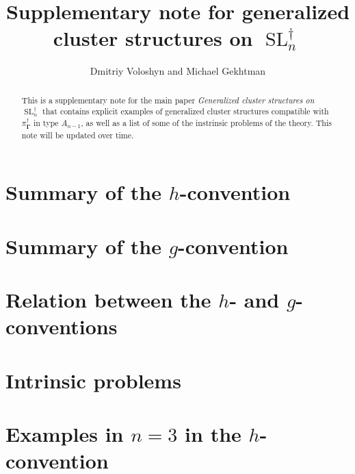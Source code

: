 \documentclass[11pt]{article}%
\DeclareMathOperator{\SL}{SL}
\newcommand{\bg}{\mathbf{\Gamma}}
\theoremstyle{definition}\newtheorem{definition}{Definition}[section]
\theoremstyle{definition}\newtheorem{remark}[definition]{Remark}
\theoremstyle{remark}
\numberwithin{equation}{section}
\begin{document}
\setcounter{tocdepth}{2}



\title{Supplementary note for generalized cluster structures on $\SL_n^{\dagger}$}
\author{Dmitriy Voloshyn and Michael Gekhtman}
\maketitle

\makeatletter
\def\blfootnote{\xdef\@thefnmark{}\@footnotetext}
\makeatother

\begin{abstract}
This is a supplementary note for the main paper \emph{Generalized cluster structures on $\SL_n^{\dagger}$} that contains explicit examples of generalized cluster structures compatible with $\pi_{\bg}^{\dagger}$ in type $A_{n-1}$, as well as a list of some of the instrinsic problems of the theory. This note will be updated over time.
\end{abstract}


\tableofcontents

%
\section{Summary of the $h$-convention}

\section{Summary of the $g$-convention}

\section{Relation between the $h$- and $g$-conventions}

\section{Intrinsic problems}

\newpage
\section{Examples in $n=3$ in the $h$-convention}



\newpage
\end{document}
